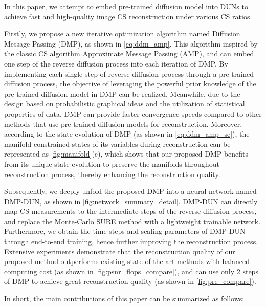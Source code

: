 \documentclass[10pt,twocolumn,letterpaper]{article}
\begin{document}
In this paper, we attempt to embed pre-trained diffusion model into DUNs to achieve fast and high-quality image CS reconstruction under various CS ratios.

Firstly, we propose a new iterative optimization algorithm named Diffusion Message Passing (DMP), as shown in \cref{eq:ddm_amp}. This algorithm inspired by the classic CS algorithm Approximate Message Passing (AMP), and can embed one step of the reverse diffusion process into each iteration of DMP. By implementing each single step of reverse diffusion process through a pre-trained diffusion process, the objective of leveraging the powerful prior knowledge of the pre-trained diffusion model in DMP can be realized. Meanwhile, due to the design based on probabilistic graphical ideas and the utilization of statistical properties of data, DMP can provide faster convergence speeds compared to other methods\cite{DBLP:conf/iclr/SongVMK23, DBLP:conf/iclr/ChungKMKY23, DBLP:conf/cvpr/FeiLPZYLZ023, DBLP:conf/nips/RoutRDCDS23, DBLP:journals/pami/SahariaHCSFN23} that use pre-trained diffusion models for reconstruction. Moreover, according to the state evolution of DMP (as shown in \cref{eq:ddm_amp_se}), the manifold-constrained states\cite{he2024manifold} of its variables during reconstruction can be represented as \cref{fig:manifold}(c), which shows that our proposed DMP benefits from its unique state evolution to preserve the manifolds throughout reconstruction process, thereby enhancing the reconstruction quality.

Subsequently, we deeply unfold the proposed DMP into a neural network named DMP-DUN, as shown in \cref{fig:network_summary_detail}. DMP-DUN can directly map CS measurements to the intermediate steps of the reverse diffusion process, and replace the Monte-Carlo SURE method\cite{DBLP:journals/tip/RamaniBU08} with a lightweight trainable network. Furthermore, we obtain the time steps and scaling parameters of DMP-DUN through end-to-end training, hence further improving the reconstruction process. Extensive experiments demonstrate that the reconstruction quality of our proposed method outperforms existing state-of-the-art methods with balanced computing cost  (as shown in \cref{fig:psnr_flops_compare}), and can use only 2 steps of DMP to achieve great reconstruction quality (as shown in \cref{fig:pre_compare}).

In short, the main contributions of this paper can be summarized as follows:
\end{document}
